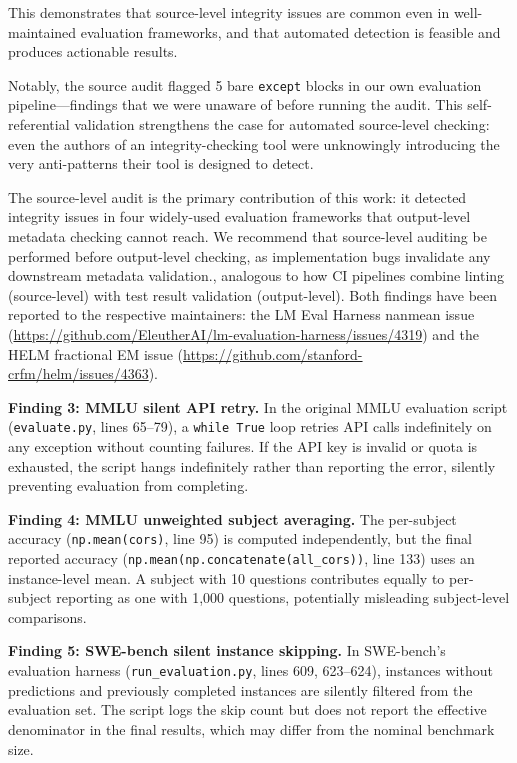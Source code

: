\documentclass[11pt]{article}
\begin{document}
This demonstrates that source-level integrity issues are common even in well-maintained evaluation frameworks, and that automated detection is feasible and produces actionable results.

Notably, the source audit flagged 5 bare \texttt{except} blocks in our own evaluation pipeline—findings that we were unaware of before running the audit. This self-referential validation strengthens the case for automated source-level checking: even the authors of an integrity-checking tool were unknowingly introducing the very anti-patterns their tool is designed to detect.

The source-level audit is the primary contribution of this work: it detected integrity issues in four widely-used evaluation frameworks that output-level metadata checking cannot reach. We recommend that source-level auditing be performed before output-level checking, as implementation bugs invalidate any downstream metadata validation., analogous to how CI pipelines combine linting (source-level) with test result validation (output-level). Both findings have been reported to the respective maintainers: the LM Eval Harness nanmean issue (\url{https://github.com/EleutherAI/lm-evaluation-harness/issues/4319}) and the HELM fractional EM issue (\url{https://github.com/stanford-crfm/helm/issues/4363}).

\textbf{Finding 3: MMLU silent API retry.} In the original MMLU evaluation script (\texttt{evaluate.py}, lines 65--79), a \texttt{while True} loop retries API calls indefinitely on any exception without counting failures. If the API key is invalid or quota is exhausted, the script hangs indefinitely rather than reporting the error, silently preventing evaluation from completing.

\textbf{Finding 4: MMLU unweighted subject averaging.} The per-subject accuracy (\texttt{np.mean(cors)}, line 95) is computed independently, but the final reported accuracy (\texttt{np.mean(np.concatenate(all\_cors))}, line 133) uses an instance-level mean. A subject with 10 questions contributes equally to per-subject reporting as one with 1{,}000 questions, potentially misleading subject-level comparisons.

\textbf{Finding 5: SWE-bench silent instance skipping.} In SWE-bench's evaluation harness (\texttt{run\_evaluation.py}, lines 609, 623--624), instances without predictions and previously completed instances are silently filtered from the evaluation set. The script logs the skip count but does not report the effective denominator in the final results, which may differ from the nominal benchmark size.
\end{document}
